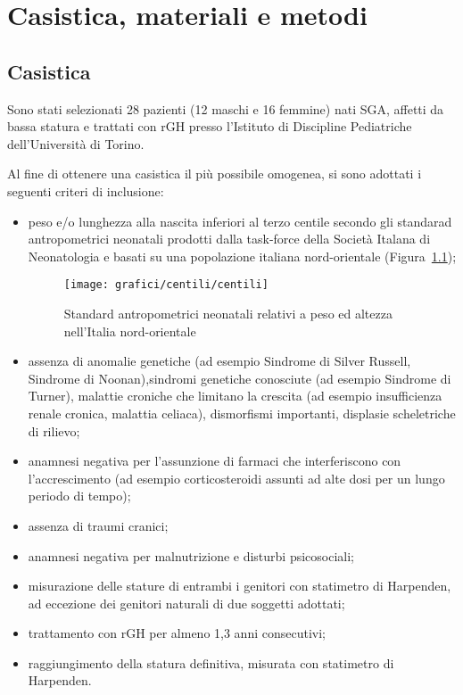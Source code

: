 \chapter{Casistica, materiali e metodi}

\section{Casistica}

Sono stati selezionati 28 pazienti (12 maschi e 16 femmine) nati SGA, affetti da bassa statura e trattati con rGH presso l'Istituto di Discipline Pediatriche dell'Università  di Torino.

Al fine di ottenere una casistica il più possibile omogenea, si sono adottati i seguenti criteri di inclusione:

\begin{itemize}
\item peso e/o lunghezza alla nascita inferiori al terzo centile secondo gli standarad antropometrici neonatali prodotti dalla task-force della Società Italana di Neonatologia e basati su una popolazione italiana nord-orientale (Figura~\ref{fig:StandardNeonataliNordOccidentali});
\begin{figure}[!h]
  \begin{center}
      \texttt{[image: grafici/centili/centili]} %
  \end{center}
  \caption{Standard antropometrici neonatali relativi a peso ed altezza nell'Italia nord-orientale}%
  \label{fig:StandardNeonataliNordOccidentali}
\end{figure}
\item assenza di anomalie genetiche (ad esempio Sindrome di Silver Russell, Sindrome di Noonan),sindromi genetiche conosciute (ad esempio Sindrome di Turner), malattie croniche che limitano la crescita (ad esempio insufficienza renale cronica, malattia celiaca), dismorfismi importanti, displasie scheletriche di rilievo;
 \item anamnesi negativa per l'assunzione di farmaci che interferiscono con l'accrescimento (ad esempio corticosteroidi assunti ad alte dosi per un lungo periodo di tempo);
 \item assenza di traumi cranici;
 \item anamnesi negativa per malnutrizione e disturbi psicosociali;
 \item misurazione delle stature di entrambi i genitori con statimetro di Harpenden, ad eccezione dei genitori naturali di due soggetti adottati;
\item trattamento con rGH per almeno 1,3 anni consecutivi;
\item raggiungimento della statura definitiva, misurata con statimetro di Harpenden. 
\end{itemize}

